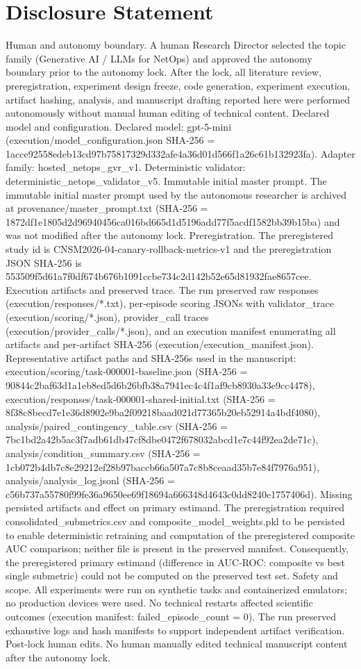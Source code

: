 \documentclass[conference]{IEEEtran}
\begin{document}
\section*{Disclosure Statement}
Human and autonomy boundary. A human Research Director selected the topic family (Generative AI / LLMs for NetOps) and approved the autonomy boundary prior to the autonomy lock. After the lock, all literature review, preregistration, experiment design freeze, code generation, experiment execution, artifact hashing, analysis, and manuscript drafting reported here were performed autonomously without manual human editing of technical content. Declared model and configuration. Declared model: gpt-5-mini (execution/model\_configuration.json SHA‑256 = 1acce92558edeb13cd97b75817329d332afe4a36d01d566f1a26c61b132923fa). Adapter family: hosted\_netops\_gvr\_v1. Deterministic validator: deterministic\_netops\_validator\_v5. Immutable initial master prompt. The immutable initial master prompt used by the autonomous researcher is archived at provenance/master\_prompt.txt (SHA‑256 = 1872df1e1805d2d96940456ca016bd665d1d5196add77f5acdf1582bb39b15ba) and was not modified after the autonomy lock. Preregistration. The preregistered study id is CNSM2026-04-canary-rollback-metrics-v1 and the preregistration JSON SHA‑256 is 553509f5d61a7f0df674b676b1091ccbe734c2d142b52e65d81932fae8657cee. Execution artifacts and preserved trace. The run preserved raw responses (execution/responses/*.txt), per‑episode scoring JSONs with validator\_trace (execution/scoring/*.json), provider\_call traces (execution/provider\_calls/*.json), and an execution manifest enumerating all artifacts and per‑artifact SHA‑256 (execution/execution\_manifest.json). Representative artifact paths and SHA‑256s used in the manuscript: execution/scoring/task-000001-baseline.json (SHA‑256 = 90844c2baf63d1a1eb8ed5d6b26bfb38a7941ec4c4f1af9cb8930a33e9cc4478), execution/responses/task-000001-shared-initial.txt (SHA‑256 = 8f38c8becd7e1e36d8902e9ba2f09218baad021d77365b20eb52914a4bdf4080), analysis/paired\_contingency\_table.csv (SHA‑256 = 7bc1bd2a42b5ac3f7adb61db47cf8dbe0472f678032abcd1e7c44f92ea2de71c), analysis/condition\_summary.csv (SHA‑256 = 1cb072b4db7c8e29212ef28b97baccb66a507a7c8b8ceaad35b7e84f7976a951), analysis/analysis\_log.jsonl (SHA‑256 = c56b737a55780f99fe36a9650ee69f18694a666348d4643c0dd8240e1757406d). Missing persisted artifacts and effect on primary estimand. The preregistration required consolidated\_submetrics.csv and composite\_model\_weights.pkl to be persisted to enable deterministic retraining and computation of the preregistered composite AUC comparison; neither file is present in the preserved manifest. Consequently, the preregistered primary estimand (difference in AUC‑ROC: composite vs best single submetric) could not be computed on the preserved test set. Safety and scope. All experiments were run on synthetic tasks and containerized emulators; no production devices were used. No technical restarts affected scientific outcomes (execution manifest: failed\_episode\_count = 0). The run preserved exhaustive logs and hash manifests to support independent artifact verification. Post‑lock human edits. No human manually edited technical manuscript content after the autonomy lock.
\end{document}

